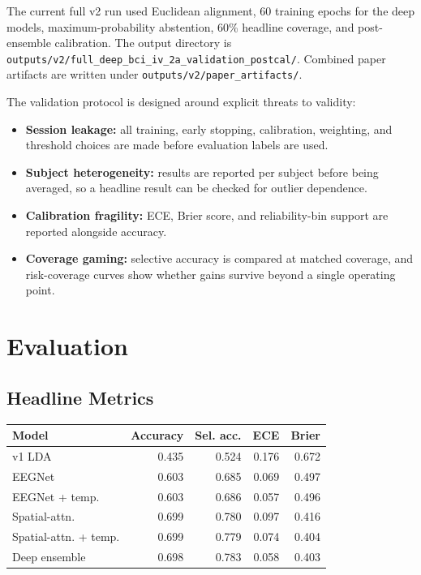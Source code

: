 \documentclass[11pt]{article}
\begin{document}
The current full v2 run used Euclidean alignment, 60 training epochs for the
deep models, maximum-probability abstention, 60\% headline coverage, and
post-ensemble calibration. The output directory is
\texttt{outputs/v2/full\_deep\_bci\_iv\_2a\_validation\_postcal/}. Combined
paper artifacts are written under
\texttt{outputs/v2/paper\_artifacts/}.

The validation protocol is designed around explicit threats to validity:
\begin{itemize}
  \item \textbf{Session leakage:} all training, early stopping, calibration,
  weighting, and threshold choices are made before evaluation labels are used.
  \item \textbf{Subject heterogeneity:} results are reported per subject before
  being averaged, so a headline result can be checked for outlier dependence.
  \item \textbf{Calibration fragility:} ECE, Brier score, and reliability-bin
  support are reported alongside accuracy.
  \item \textbf{Coverage gaming:} selective accuracy is compared at matched
  coverage, and risk-coverage curves show whether gains survive beyond a
  single operating point.
\end{itemize}

\section{Evaluation}

\subsection{Headline Metrics}

\begin{center}
\begin{tabular}{lrrrr}
\toprule
Model & Accuracy & Sel. acc. & ECE & Brier \\
\midrule
v1 LDA & 0.435 & 0.524 & 0.176 & 0.672 \\
EEGNet & 0.603 & 0.685 & 0.069 & 0.497 \\
EEGNet + temp. & 0.603 & 0.686 & 0.057 & 0.496 \\
Spatial-attn. & 0.699 & 0.780 & 0.097 & 0.416 \\
Spatial-attn. + temp. & 0.699 & 0.779 & 0.074 & 0.404 \\
Deep ensemble & 0.698 & 0.783 & 0.058 & 0.403 \\
\bottomrule
\end{tabular}
\end{center}
\end{document}
